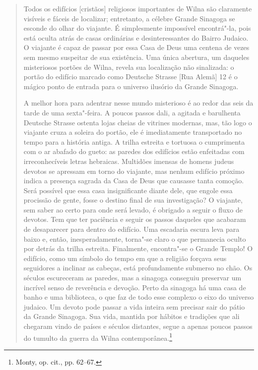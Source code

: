 \begin{quote}
Todos os edifícios {[}cristãos{]} religiosos importantes de Wilna são
claramente visíveis e fáceis de localizar; entretanto, a célebre Grande
Sinagoga se esconde do olhar do viajante. É simplesmente impossível
encontrá"-la, pois está oculta atrás de casas ordinárias e
desinteressantes do Bairro Judaico. O viajante é capaz de passar por
essa Casa de Deus uma centena de vezes sem mesmo suspeitar de sua
existência. Uma única abertura, um daqueles misteriosos portões de
Wilna, revela sua localização não sinalizada: o portão do edifício
marcado como Deutsche Strasse {[}Rua Alemã{]} 12 é o mágico ponto de
entrada para o universo ilusório da Grande Sinagoga.

A melhor hora para adentrar nesse mundo misterioso é ao redor das seis
da tarde de uma sexta"-feira. A poucos passos dali, a agitada e
barulhenta Deutsche Strasse ostenta lojas cheias de vitrines modernas,
mas, tão logo o viajante cruza a soleira do portão, ele é imediatamente
transportado no tempo para a história antiga. A trilha estreita e
tortuosa o cumprimenta com o ar abafado do gueto: as paredes dos
edifícios estão enfeitadas com irreconhecíveis letras hebraicas.
Multidões imensas de homens judeus devotos se apressam em torno do
viajante, mas nenhum edifício próximo indica a presença sagrada da Casa
de Deus que causasse tanta comoção. Será possível que essa casa
insignificante diante dele, que engole essa procissão de gente, fosse o
destino final de sua investigação? O viajante, sem saber ao certo para
onde será levado, é obrigado a seguir o fluxo de devotos. Tem que ter
paciência e seguir os passos daqueles que acabaram de desaparecer para
dentro do edifício. Uma escadaria escura leva para baixo e, então,
inesperadamente, torna"-se claro o que permanecia oculto por detrás da
trilha estreita. Finalmente, encontra"-se o Grande Templo! O edifício,
como um símbolo do tempo em que a religião forçava seus seguidores a
inclinar as cabeças, está profundamente submerso no chão. Os séculos
escureceram as paredes, mas a sinagoga conseguiu preservar um incrível
senso de reverência e devoção. Perto da sinagoga há uma casa de banho e
uma biblioteca, o que faz de todo esse complexo o eixo do universo
judaico. Um devoto pode passar a vida inteira sem precisar sair do pátio
da Grande Sinagoga. Sua vida, mantida por hábitos e tradições que ali
chegaram vindo de países e séculos distantes, segue a apenas poucos
passos do tumulto da guerra da Wilna contemporânea.\footnote{Monty, op.
  cit., pp. 62--67.}
  \end{quote}

